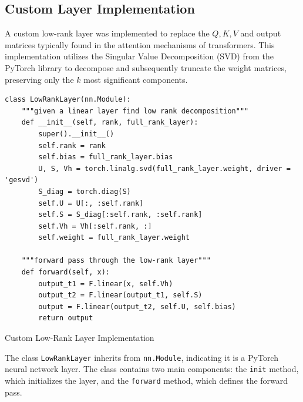     \subsection{Custom Layer Implementation}
        A custom low-rank layer was implemented to replace the \(Q, K, V\) and output matrices typically found in the attention mechanisms of transformers. This implementation utilizes the Singular Value Decomposition (SVD) from the PyTorch library to decompose and subsequently truncate the weight matrices, preserving only the \(k\) most significant components.
        \begin{listing}[H]
\begin{verbatim}
class LowRankLayer(nn.Module):
    """given a linear layer find low rank decomposition"""
    def __init__(self, rank, full_rank_layer):
        super().__init__()
        self.rank = rank
        self.bias = full_rank_layer.bias
        U, S, Vh = torch.linalg.svd(full_rank_layer.weight, driver = 'gesvd')
        S_diag = torch.diag(S)
        self.U = U[:, :self.rank]
        self.S = S_diag[:self.rank, :self.rank]
        self.Vh = Vh[:self.rank, :]
        self.weight = full_rank_layer.weight

    """forward pass through the low-rank layer"""
    def forward(self, x):
        output_t1 = F.linear(x, self.Vh)
        output_t2 = F.linear(output_t1, self.S)
        output = F.linear(output_t2, self.U, self.bias)
        return output
\end{verbatim}
            \caption{Custom Low-Rank Layer Implementation}
            \label{listing:LowRankLayer_Implementation}
            \end{listing}
            
            The class \texttt{LowRankLayer} inherits from \texttt{nn.Module}, indicating it is a PyTorch neural network layer. The class contains two main components: the \texttt{init} method, which initializes the layer, and the \texttt{forward} method, which defines the forward pass.

